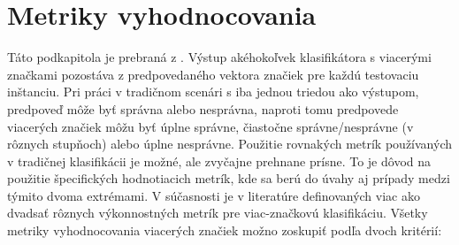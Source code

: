 \section{Metriky vyhodnocovania}
Táto podkapitola je prebraná z \cite{Herrera:2016}. Výstup akéhokoľvek klasifikátora s viacerými značkami pozostáva z predpovedaného vektora značiek pre každú testovaciu inštanciu. Pri práci v tradičnom scenári s iba jednou triedou ako výstupom,  predpoveď môže byť správna alebo nesprávna, naproti tomu predpovede viacerých značiek môžu byť úplne správne, čiastočne správne/nesprávne (v rôznych stupňoch) alebo úplne nesprávne.
Použitie rovnakých metrík používaných v tradičnej klasifikácii je možné, ale zvyčajne prehnane prísne. To je dôvod na použitie špecifických hodnotiacich metrík, kde sa berú do úvahy aj prípady medzi týmito dvoma extrémami.
V súčasnosti je v literatúre definovaných viac ako dvadsať rôznych výkonnostných metrík pre viac-značkovú klasifikáciu. Všetky metriky vyhodnocovania viacerých značiek možno zoskupiť podľa dvoch kritérií:
